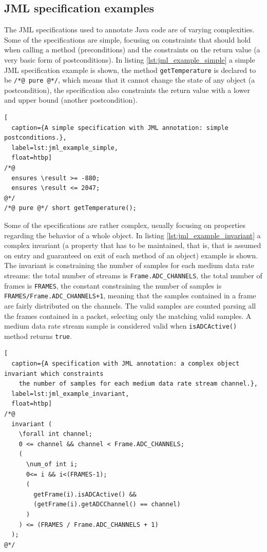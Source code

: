 \documentclass{article} \usepackage{times}
\newcommand{\lil}[1]{\texttt{\lstinline|#1|}}
\begin{document}
\subsection{JML specification examples}
\label{subsec:a_jml_specification_example}

The JML specifications used to annotate Java code are of varying complexities.
Some of the specifications are simple, focusing on constraints that should hold when 
calling a method (preconditions) and the constraints on the return value (a very basic form of 
postconditions).
In listing \ref{lst:jml_example_simple} a simple JML specification example is shown, the 
method \lil{getTemperature} is declared to be \lil{/*@ pure @*/}, which means that 
it cannot change the state of any object (a postcondition), the specification also constraints 
the return value with a lower and upper bound (another postcondition).

\begin{lstlisting}[
  caption={A simple specification with JML annotation: simple postconditions.},
  label=lst:jml_example_simple,
  float=htbp]
/*@ 
  ensures \result >= -880;
  ensures \result <= 2047;
@*/
/*@ pure @*/ short getTemperature();
\end{lstlisting}

\sloppy

Some of the specifications are rather complex, usually focusing on properties regarding the 
behavior of a whole object.
In listing \ref{lst:jml_example_invariant} a complex invariant 
(a property that has to be maintained, that is, that is assumed on entry and guaranteed on 
exit of each method of an object)
example is shown. 
The invariant is constraining the number of samples for each medium data rate streams: 
the total number of streams is \lil{Frame.ADC_CHANNELS}, the total number of frames is 
\lil{FRAMES}, the constant constraining the number of samples is 
\lil{FRAMES/Frame.ADC_CHANNELS+1}, meaning that the samples contained in a frame are
fairly distributed on the channels. 
The valid samples are counted parsing all the frames contained in a packet, selecting only 
the matching valid samples.
A medium data rate stream sample is considered valid when \lil{isADCActive()} method 
returns \lil{true}.

\fussy

\begin{lstlisting}[
  caption={A specification with JML annotation: a complex object invariant which constraints 
    the number of samples for each medium data rate stream channel.},
  label=lst:jml_example_invariant,
  float=htbp]
/*@ 
  invariant (
    \forall int channel;
    0 <= channel && channel < Frame.ADC_CHANNELS; 
    (
      \num_of int i;
      0<= i && i<(FRAMES-1);
      (
        getFrame(i).isADCActive() &&
        (getFrame(i).getADCChannel() == channel)
      )
    ) <= (FRAMES / Frame.ADC_CHANNELS + 1)
  );
@*/
\end{lstlisting}
\end{document}
